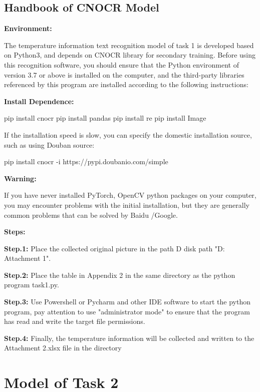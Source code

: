 \documentclass{apmcmthesis}
\begin{document}
	\subsection{Handbook of CNOCR Model}
		
		\noindent\textbf{Environment:}
		
		The temperature information text recognition model of task 1 is developed based on Python3, and depends on CNOCR library for secondary training. Before using this recognition software, you should ensure that the Python environment of version 3.7 or above is installed on the computer, and the third-party libraries referenced by this program are installed according to the following instructions:
		
	\noindent\textbf{Install Dependence:}
			
		\begin{tcode}
		pip install cnocr
		pip install pandas
		pip install re
		pip install Image
		\end{tcode}	
	If the installation speed is slow, you can specify the domestic installation source, such as using Douban source:
		\begin{tcode}
		pip install cnocr -i https://pypi.doubanio.com/simple
	\end{tcode}	
	
	\noindent\textbf{Warning:}
	
		If you have never installed PyTorch, OpenCV python packages on your computer, you may encounter problems with the initial installation, but they are generally common problems that can be solved by Baidu /Google.	
		
		
   	\noindent\textbf{Steps:}	
   	
   	\textbf{Step.1:}  Place the collected original picture in the path D disk path "D:\\Attachment 1".
   	
   	\textbf{Step.2:}  Place the table in Appendix 2 in the same directory as the python program task1.py.
   	
   	\textbf{Step.3:} Use Powershell or Pycharm and other IDE software to start the python program, pay attention to use "administrator mode" to ensure that the program has read and write the target file permissions.
   	
   	\textbf{Step.4:} Finally, the temperature information will be collected and written to the Attachment 2.xlsx file in the directory
\section{Model of Task 2}
\end{document}

